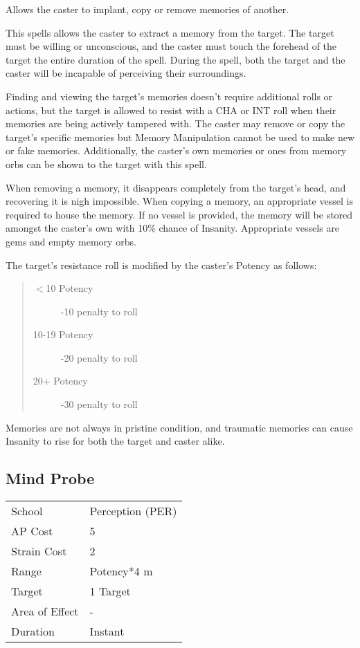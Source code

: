 \documentclass[11pt,a4paper,twocolumn]{book}
\begin{document}
\medskip
Allows the caster to implant, copy or remove memories of another.

This spells allows the caster to extract a memory from the target. The target must be willing or unconscious, and the caster must touch the forehead of the target the entire duration of the spell. During the spell, both the target and the caster will be incapable of perceiving their surroundings.

Finding and viewing the target's memories doesn't require additional rolls or actions, but the target is allowed to resist with a CHA or INT roll when their memories are being actively tampered with. The caster may remove or copy the target's specific memories but Memory Manipulation cannot be used to make new or fake memories. Additionally, the caster's own memories or ones from memory orbs can be shown to the target with this spell.

When removing a memory, it disappears completely from the target's head, and recovering it is nigh impossible. When copying a memory, an appropriate vessel is required to house the memory. If no vessel is provided, the memory will be stored amongst the caster's own with 10\% chance of Insanity. Appropriate vessels are gems and empty memory orbs.

The target's resistance roll is modified by the caster's Potency as follows:

\begin{quote}
	\begin{description}
		\item[$<$10 Potency] 	-10 penalty to roll
		\item[10-19 Potency] 	-20 penalty to roll
		\item[20+ Potency] 	-30 penalty to roll
	\end{description}
\end{quote}

Memories are not always in pristine condition, and traumatic memories can cause Insanity to rise for both the target and caster alike.


\bigskip

\subsection*{Mind Probe}
{
	\begin{tabu} to 75mm{| X[l,4] | X[l,7] |}
		\hline
		School 			& Perception (PER) 		\\
		AP Cost	      	& 5 					\\
		Strain Cost     & 2 					\\
		Range     		& Potency*4	m			\\
		Target      	& 1 Target				\\
		Area of Effect  & -  	 				\\
		Duration     	& Instant	\\ \hline
	\end{tabu}
	
}
\end{document}
